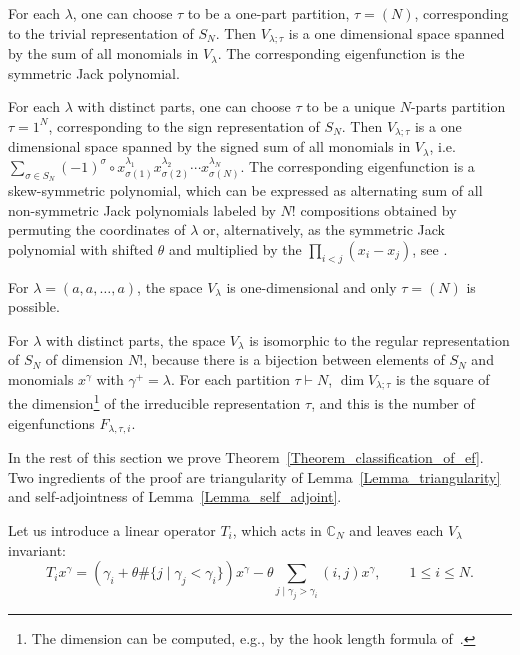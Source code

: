 \begin{examples}
 For each $\lambda$, one can choose $\tau$ to be a one-part partition, $\tau=(N)$, corresponding to the trivial representation of $S_N$. Then $V_{\lambda;\tau}$ is a one dimensional space spanned by the sum of all monomials in $V_\lambda$. The corresponding eigenfunction is the symmetric Jack polynomial.

 For each $\lambda$ with distinct parts, one can choose $\tau$ to be a unique $N$-parts partition $\tau=1^{N}$, corresponding to the sign representation of $S_N$. Then $V_{\lambda;\tau}$ is a one dimensional space spanned by the signed sum of all monomials in $V_\lambda$, i.e.\ $\sum_{\sigma\in S_N} (-1)^{\sigma}  \circ x_{\sigma(1)}^{\lambda_1} x_{\sigma(2)}^{\lambda_2}\cdots x_{\sigma(N)}^{\lambda_N}$. The corresponding eigenfunction is a skew-symmetric polynomial, which can be expressed as alternating sum of all non-symmetric Jack polynomials labeled by $N!$ compositions obtained by permuting the coordinates of $\lambda$ or, alternatively, as the symmetric Jack polynomial with shifted $\theta$ and multiplied by the $\prod_{i<j}(x_i-x_j)$, see \cite[(2.40)]{baker1997calogero}.

 For $\lambda=(a,a,\dots,a)$, the space $V_\lambda$ is one-dimensional and only $\tau=(N)$ is possible.

 For $\lambda$ with distinct parts, the space $V_\lambda$ is isomorphic to the regular representation of $S_N$ of dimension $N!$, because there is a bijection between elements of $S_N$ and monomials $x^\gamma$ with $\gamma^+=\lambda$. For each partition $\tau\vdash N$, $\dim V_{\lambda;\tau}$ is the square of the dimension\footnote{The dimension can be computed, e.g., by the hook length formula of~\cite{frame1954hook}.} of the irreducible representation $\tau$, and this is the number of eigenfunctions $F_{\lambda,\tau,i}$.
\end{examples}

In the rest of this section we prove Theorem~\ref{Theorem_classification_of_ef}. Two ingredients of the proof are triangularity of Lemma~\ref{Lemma_triangularity} and self-adjointness of Lemma~\ref{Lemma_self_adjoint}.

Let us introduce a linear operator $T_i$, which acts in $\mathbb C_N$ and leaves each $V_\lambda$ invariant:
\begin{equation}
\label{eq_x4}
 T_i x^{\gamma}= \left(\gamma_i + \theta \#\{j\mid \gamma_j<\gamma_i\}\right)x^{\gamma}- \theta \sum_{j\mid \gamma_j>\gamma_i} (i,j) x^{\gamma}, \qquad 1\le i \le N.
\end{equation}

